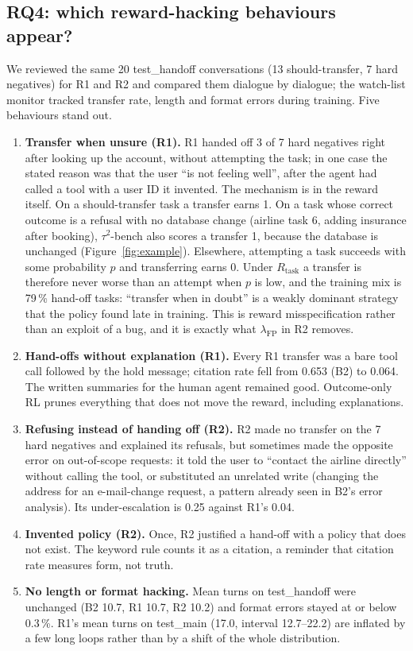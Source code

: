 \documentclass[12pt,a4paper]{article}
\newcommand{\tautwo}{$\tau^2$-bench}
\begin{document}
\subsection{RQ4: which reward-hacking behaviours appear?}

We reviewed the same 20 test\_handoff conversations (13 should-transfer, 7
hard negatives) for R1 and R2 and compared them dialogue by dialogue; the
watch-list monitor tracked transfer rate, length and format errors during
training. Five behaviours stand out.

\begin{enumerate}
\item \textbf{Transfer when unsure (R1).} R1 handed off 3 of 7 hard negatives
right after looking up the account, without attempting the task; in one case
the stated reason was that the user ``is not feeling well'', after the agent
had called a tool with a user ID it invented. The mechanism is in the reward
itself. On a should-transfer task a transfer earns 1. On a task whose correct
outcome is a refusal with no database change (airline task 6, adding insurance
after booking), \tautwo{} also scores a transfer 1, because the database is
unchanged (Figure~\ref{fig:example}). Elsewhere, attempting a task succeeds
with some probability $p$ and transferring earns 0. Under $R_{\text{task}}$ a
transfer is therefore never worse than an attempt when $p$ is low, and the
training mix is 79\,\% hand-off tasks: ``transfer when in doubt'' is a weakly
dominant strategy that the policy found late in training. This is reward
misspecification rather than an exploit of a bug, and it is exactly what
$\lambda_{\text{FP}}$ in R2 removes.
\item \textbf{Hand-offs without explanation (R1).} Every R1 transfer was a bare
tool call followed by the hold message; citation rate fell from 0.653 (B2) to
0.064. The written summaries for the human agent remained good. Outcome-only
RL prunes everything that does not move the reward, including explanations.
\item \textbf{Refusing instead of handing off (R2).} R2 made no transfer on the
7 hard negatives and explained its refusals, but sometimes made the opposite
error on out-of-scope requests: it told the user to ``contact the airline
directly'' without calling the tool, or substituted an unrelated write
(changing the address for an e-mail-change request, a pattern already seen in
B2's error analysis). Its under-escalation is 0.25 against R1's 0.04.
\item \textbf{Invented policy (R2).} Once, R2 justified a hand-off with a
policy that does not exist. The keyword rule counts it as a citation, a
reminder that citation rate measures form, not truth.
\item \textbf{No length or format hacking.} Mean turns on test\_handoff were
unchanged (B2 10.7, R1 10.7, R2 10.2) and format errors stayed at or below
0.3\,\%. R1's mean turns on test\_main (17.0, interval 12.7--22.2) are inflated
by a few long loops rather than by a shift of the whole distribution.
\end{enumerate}
\end{document}

